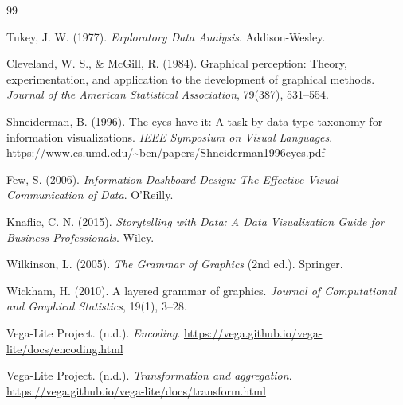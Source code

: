 \documentclass[UTF8,fontset=fandol,openany,zihao=-4]{ctexbook}
\begin{document}
\begin{thebibliography}{99}
\raggedright
{}
Tukey, J. W. (1977).
\emph{Exploratory Data Analysis}.
Addison-Wesley.

Cleveland, W. S., \& McGill, R. (1984).
Graphical perception: Theory, experimentation, and application to the development of graphical methods.
\emph{Journal of the American Statistical Association}, 79(387), 531--554.

Shneiderman, B. (1996).
The eyes have it: A task by data type taxonomy for information visualizations.
\emph{IEEE Symposium on Visual Languages}.
\url{https://www.cs.umd.edu/~ben/papers/Shneiderman1996eyes.pdf}

Few, S. (2006).
\emph{Information Dashboard Design: The Effective Visual Communication of Data}.
O'Reilly.

Knaflic, C. N. (2015).
\emph{Storytelling with Data: A Data Visualization Guide for Business Professionals}.
Wiley.

Wilkinson, L. (2005).
\emph{The Grammar of Graphics} (2nd ed.).
Springer.

Wickham, H. (2010).
A layered grammar of graphics.
\emph{Journal of Computational and Graphical Statistics}, 19(1), 3--28.

Vega-Lite Project. (n.d.).
\emph{Encoding}.
\url{https://vega.github.io/vega-lite/docs/encoding.html}

Vega-Lite Project. (n.d.).
\emph{Transformation and aggregation}.
\url{https://vega.github.io/vega-lite/docs/transform.html}
\end{thebibliography}
\end{document}
